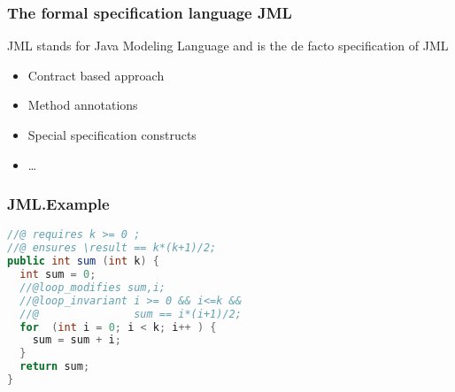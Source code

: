\documentclass{beamer}
\begin{document}
\begin{frame}\frametitle{The formal specification language JML}
 JML stands for  Java Modeling Language and is the de facto specification of JML
  \begin{itemize}
     \item Contract based approach
     
       \item Method annotations
	          \item Special specification constructs  
         \item \ldots

  \end{itemize}
\end{frame}

\begin{frame}\frametitle{JML.Example}
  \begin{lstlisting}[language=java]
//@ requires k >= 0 ;
//@ ensures \result == k*(k+1)/2;
public int sum (int k) {
  int sum = 0;		
  //@loop_modifies sum,i;
  //@loop_invariant i >= 0 && i<=k && 
  //@               sum == i*(i+1)/2;
  for  (int i = 0; i < k; i++ ) {
    sum = sum + i;
  } 	
  return sum;
}
\end{lstlisting} 
\end{frame}
\end{document}
